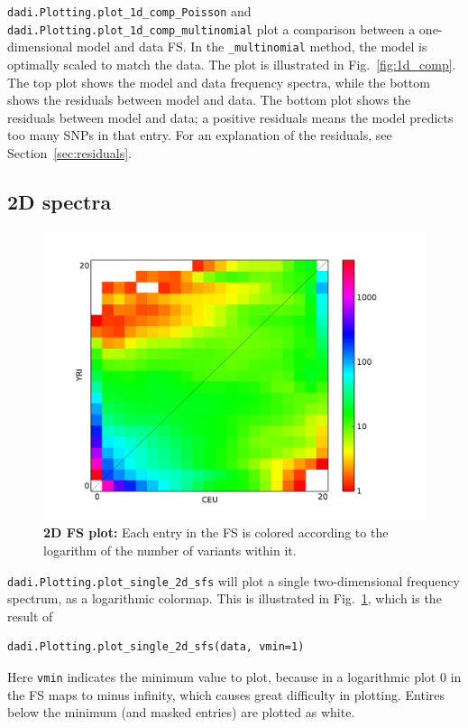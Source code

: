 \documentclass[12pt]{article}
\makeatletter
\newcommand{\py}[1]{\lstinline[language=Python, showstringspaces=False]@#1@}
\makeatother
\begin{document}
\py{dadi.Plotting.plot_1d_comp_Poisson} and \py{dadi.Plotting.plot_1d_comp_multinomial} plot a comparison between a one-dimensional model and data FS.
In the \py{_multinomial} method, the model is optimally scaled to match the data.
The plot is illustrated in Fig.~\ref{fig:1d_comp}.
The top plot shows the model and data frequency spectra, while the bottom shows the residuals between model and data.
The bottom plot shows the residuals between model and data; a positive residuals means the model predicts too many SNPs in that entry.
For an explanation of the residuals, see Section~\ref{sec:residuals}.

\subsection{2D spectra}

\begin{figure}
\centering
\includegraphics[scale=0.3]{2d_single}
\caption{\textbf{2D FS plot:} Each entry in the FS is colored according to the logarithm of the number of variants within it.\label{fig:2d_single}}
\end{figure}

\py{dadi.Plotting.plot_single_2d_sfs} will plot a single two-dimensional frequency spectrum, as a logarithmic colormap.
This is illustrated in Fig.~\ref{fig:2d_single}, which is the result of
\begin{lstlisting}
dadi.Plotting.plot_single_2d_sfs(data, vmin=1)
\end{lstlisting}
Here \py{vmin} indicates the minimum value to plot, because in a logarithmic plot 0 in the FS maps to minus infinity, which causes great difficulty in plotting.
Entires below the minimum (and masked entries) are plotted as white.
\end{document}
